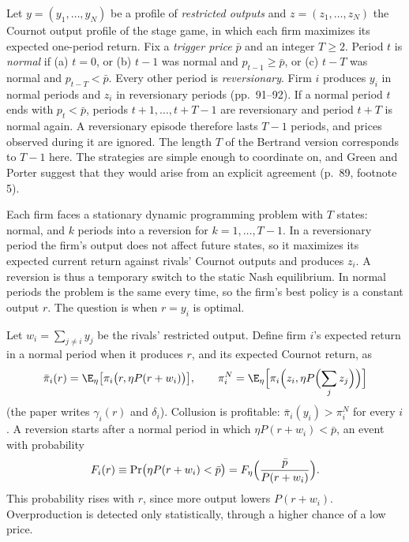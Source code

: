 Let $y = (y_1, \dots, y_N)$ be a profile of \emph{restricted outputs} and $z = (z_1, \dots, z_N)$ the Cournot output
profile of the stage game, in which each firm maximizes its expected one-period return. Fix a \emph{trigger price}
$\bar p$ and an integer $T \ge 2$. Period $t$ is \emph{normal} if (a) $t = 0$, or (b) $t - 1$ was normal and
$p_{t-1} \ge \bar p$, or (c) $t - T$ was normal and $p_{t - T} < \bar p$. Every other period is
\emph{reversionary}. Firm $i$ produces $y_i$ in normal periods and $z_i$ in reversionary periods (pp.~91--92). If a
normal period $t$ ends with $p_t < \bar p$, periods $t + 1, \dots, t + T - 1$ are reversionary and period $t + T$ is
normal again. A reversionary episode therefore lasts $T - 1$ periods, and prices observed during it are ignored. The
length $T$ of the Bertrand version corresponds to $T - 1$ here. The strategies are simple enough to coordinate on,
and Green and Porter suggest that they would arise from an explicit agreement (p.~89, footnote 5).

Each firm faces a stationary dynamic programming problem with $T$ states: normal, and $k$ periods into a reversion
for $k = 1, \dots, T - 1$. In a reversionary period the firm's output does not affect future states, so it maximizes
its expected current return against rivals' Cournot outputs and produces $z_i$. A reversion is thus a temporary
switch to the static Nash equilibrium. In normal periods the problem is the same every time, so the firm's best
policy is a constant output $r$. The question is when $r = y_i$ is optimal.

Let $w_i = \sum_{j \ne i}y_j$ be the rivals' restricted output. Define firm $i$'s expected return in a normal period
when it produces $r$, and its expected Cournot return, as
\begin{equation}\label{eq:12-gp-returns}
\bar\pi_i(r) = \E_\eta\bigl[\pi_i\bigl(r, \eta P(r + w_i)\bigr)\bigr],
\qquad
\pi_i^N = \E_\eta\Bigl[\pi_i\Bigl(z_i, \eta P\Bigl(\sum_j z_j\Bigr)\Bigr)\Bigr]
\end{equation}
(the paper writes $\gamma_i(r)$ and $\delta_i$). Collusion is profitable: $\bar\pi_i(y_i) > \pi_i^N$ for every $i$.
A reversion starts after a normal period in which $\eta P(r + w_i) < \bar p$, an event with probability
\begin{equation}\label{eq:12-gp-Fr}
F_i(r) \equiv \Pr\bigl(\eta P(r + w_i) < \bar p\bigr) = F_\eta\Bigl(\frac{\bar p}{P(r + w_i)}\Bigr).
\end{equation}
This probability rises with $r$, since more output lowers $P(r + w_i)$. Overproduction is detected only
statistically, through a higher chance of a low price.

